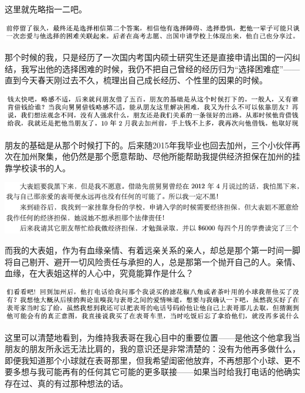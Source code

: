 \documentclass[9pt, b5paper]{article}
\begin{document}
这里就先略指一二吧。 

\begin{center}
\includegraphics[width=.9\linewidth]{./pic/backups_plans_20210501_123806.png}
\end{center}

那个时候的我，只是经历了一次国内考国内硕士研究生还是直接申请出国的一闪纠结，我写出他的选择困难的时候，我仍不把自己曾经的经历归为“选择困难症”——直到今天春天刚过去不久，梳理出自己成长经历、个性里的因果的时候。 

\begin{center}
\includegraphics[width=.9\linewidth]{./pic/backups_plans_20210501_124113.png}
\end{center}

朋友的基础是从那个时候打下的。后来随2015年我毕业也回去加州，三个小伙伴再次在加州聚集，他仍然是那个愿意帮助、尽他所能帮助我提供经济担保在加州的挂靠学校读书的人。

\begin{center}
\includegraphics[width=.9\linewidth]{./pic/backups_plans_20210501_124352.png}
\end{center}

而我的大表姐，作为有血缘亲情、有着远亲关系的亲人，却总是那个第一时间一脚将自己剔开、避开一切风险责任与承担的人，总是那第一个抛开自己的人。亲情、血缘，在大表姐这样的人心中，究竟能算作是什么？

\begin{center}
\includegraphics[width=.9\linewidth]{./pic/backups_plans_20210501_124553.png}
\end{center}

这里可以清楚地看到，为维持我表哥在我心目中的重要位置——是他这个他拿我当朋友的朋友所永远无法比肩的，我的意识还是非常清楚的：没有为他再多做什么，即便我知道那个小球就在表哥那里，但我希望闺密他放弃，不再想那个小球、更不要多想与我可能再有的任何其它可能的更多联接——如果当时给我打电话的他确实存在过、真的有过那种想法的话。 
\end{document}
